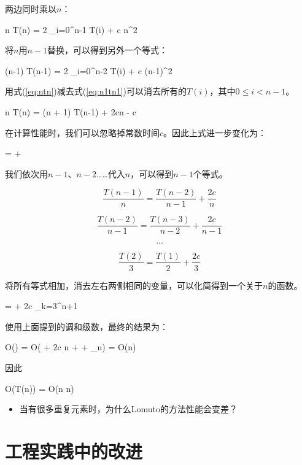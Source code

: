 \documentclass[UTF8]{article}
\begin{document}
两边同时乘以$n$：

\be
n T(n) = 2 \sum_{i=0}^{n-1} T(i) + c n^2
\label{eq:ntn}
\ee

将$n$用$n-1$替换，可以得到另外一个等式：

\be
(n-1) T(n-1) = 2 \sum_{i=0}^{n-2} T(i) + c (n-1)^2
\label{eq:n1tn1}
\ee

用式(\ref{eq:ntn})减去式(\ref{eq:n1tn1})可以消去所有的$T(i)$，其中$0 \leq i < n-1$。

\be
n T(n) = (n + 1) T(n-1) + 2cn - c
\ee

在计算性能时，我们可以忽略掉常数时间$c$。因此上式进一步变化为：

\be
{} =  + 
\ee

我们依次用$n-1$、$n-2$……代入$n$，可以得到$n-1$个等式。

\[
\frac{T(n-1)}{n} = \frac{T(n-2)}{n-1} + \frac{2c}{n}
\]

\[
\frac{T(n-2)}{n-1} = \frac{T(n-3)}{n-2} + \frac{2c}{n-1}
\]

\[
...
\]

\[
\frac{T(2)}{3} = \frac{T(1)}{2} + \frac{2c}{3}
\]

将所有等式相加，消去左右两侧相同的变量，可以化简得到一个关于$n$的函数。

\be
{} =  + 2c \sum_{k=3}^{n+1} 
\ee

使用上面提到的调和级数，最终的结果为：

\be
O() = O( + 2c \ln n + \gamma + \epsilon_n) = O(\lg n)
\ee

因此

\be
O(T(n)) = O(n \lg n)
\ee

\begin{Exercise}
\begin{itemize}
\item 当有很多重复元素时，为什么Lomuto的方法性能会变差？
\end{itemize}
\end{Exercise}


\section{工程实践中的改进}
\end{document}

